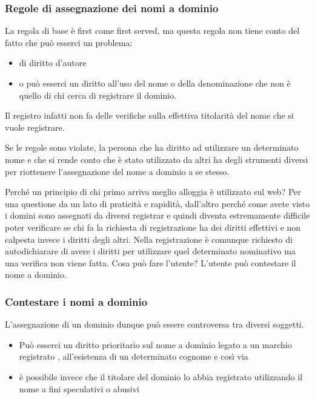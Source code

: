       \subsubsection{Regole di assegnazione dei nomi a dominio}
      La regola di base è first come first served, ma questa regola non tiene conto del fatto che può esserci un problema:
      \begin{itemize}
          \item di diritto d'autore 
          \item o può esserci un diritto all'uso del nome o della denominazione che non è quello di chi cerca di registrare il dominio. 
      \end{itemize}
        Il registro infatti non fa delle verifiche sulla effettiva titolarità del nome che si vuole registrare.   \par 
      Se le regole sono violate, la persona che ha diritto ad utilizzare un determinato nome e che si rende conto che è stato utilizzato da altri ha degli strumenti diversi per riottenere l'assegnazione del nome a dominio a se stesso.\par
      
      Perché un principio di chi primo arriva meglio alloggia è utilizzato sul web? Per una questione da un lato di praticità e rapidità, dall'altro perché come avete visto i domini sono assegnati da diversi registrar e quindi diventa estremamente difficile poter verificare se chi fa la richiesta di registrazione ha dei diritti effettivi e non calpesta invece i diritti degli altri. Nella registrazione è comunque richiesto di autodichiarare di avere i diritti per utilizzare quel determinato nominativo ma una verifica non viene fatta. Cosa può fare l'utente? L'utente può contestare il nome a dominio. 

      \subsubsection{Contestare i nomi a dominio}
      
      L'assegnazione di un dominio dunque può essere controversa tra diversi soggetti. 
      \begin{itemize}
          \item Può esserci un diritto prioritario sul nome a dominio legato a un marchio registrato , all'esistenza di un determinato cognome e così via
          \item è possibile invece che il titolare del dominio lo abbia registrato utilizzando il nome a fini speculativi o abusivi
      \end{itemize}

